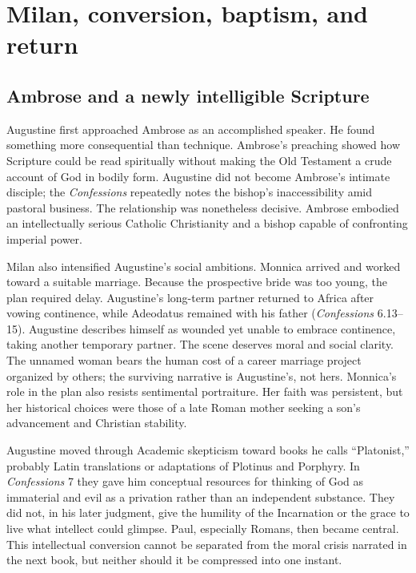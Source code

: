 \section{Milan, conversion, baptism, and return}\label{sec:aug-conversion}

\subsection{Ambrose and a newly intelligible Scripture}

Augustine first approached Ambrose as an accomplished speaker. He found
something more consequential than technique. Ambrose's preaching showed how
Scripture could be read spiritually without making the Old Testament a crude
account of God in bodily form. Augustine did not become Ambrose's intimate
disciple; the \emph{Confessions} repeatedly notes the bishop's inaccessibility
amid pastoral business. The relationship was nonetheless decisive. Ambrose
embodied an intellectually serious Catholic Christianity and a bishop capable
of confronting imperial power.

Milan also intensified Augustine's social ambitions. Monnica arrived and
worked toward a suitable marriage. Because the prospective bride was too
young, the plan required delay. Augustine's long-term partner returned to
Africa after vowing continence, while Adeodatus remained with his father
(\emph{Confessions} 6.13--15). Augustine describes himself as wounded yet
unable to embrace continence, taking another temporary partner. The scene
deserves moral and social clarity. The unnamed woman bears the human cost of a
career marriage project organized by others; the surviving narrative is
Augustine's, not hers. Monnica's role in the plan also resists sentimental
portraiture. Her faith was persistent, but her historical choices were those
of a late Roman mother seeking a son's advancement and Christian stability.

Augustine moved through Academic skepticism toward books he calls
“Platonist,” probably Latin translations or adaptations of Plotinus and
Porphyry. In \emph{Confessions} 7 they gave him conceptual resources for
thinking of God as immaterial and evil as a privation rather than an
independent substance. They did not, in his later judgment, give the humility
of the Incarnation or the grace to live what intellect could glimpse. Paul,
especially Romans, then became central. This intellectual conversion cannot be
separated from the moral crisis narrated in the next book, but neither should
it be compressed into one instant.

